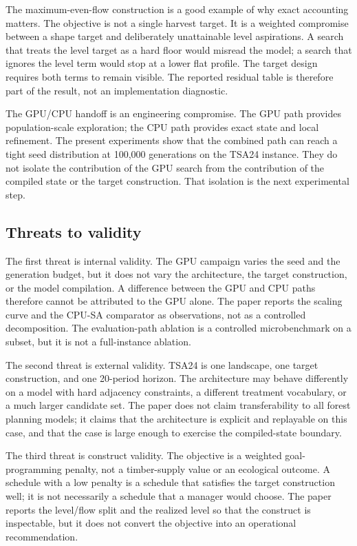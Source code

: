 \documentclass[11pt]{article}
\begin{document}
The maximum-even-flow construction is a good example of why exact accounting
matters. The objective is not a single harvest target. It is a weighted
compromise between a shape target and deliberately unattainable level
aspirations. A search that treats the level target as a hard floor would
misread the model; a search that ignores the level term would stop at a lower
flat profile. The target design requires both terms to remain visible. The
reported residual table is therefore part of the result, not an implementation
diagnostic.

The GPU/CPU handoff is an engineering compromise. The GPU path provides
population-scale exploration; the CPU path provides exact state and local
refinement. The present experiments show that the combined path can reach a
tight seed distribution at 100,000 generations on the TSA24 instance. They do
not isolate the contribution of the GPU search from the contribution of the
compiled state or the target construction. That isolation is the next
experimental step.

\subsection{Threats to validity}

The first threat is internal validity. The GPU campaign varies the seed and the generation budget, but
it does not vary the architecture, the target construction, or the model compilation. A difference
between the GPU and CPU paths therefore cannot be attributed to the GPU alone. The paper reports the
scaling curve and the CPU-SA comparator as observations, not as a controlled decomposition. The
evaluation-path ablation is a controlled microbenchmark on a subset, but it is not a full-instance
ablation.

The second threat is external validity. TSA24 is one landscape, one target construction, and one
20-period horizon. The architecture may behave differently on a model with hard adjacency constraints,
a different treatment vocabulary, or a much larger candidate set. The paper does not claim
transferability to all forest planning models; it claims that the architecture is explicit and
replayable on this case, and that the case is large enough to exercise the compiled-state boundary.

The third threat is construct validity. The objective is a weighted goal-programming penalty, not a
timber-supply value or an ecological outcome. A schedule with a low penalty is a schedule that
satisfies the target construction well; it is not necessarily a schedule that a manager would choose.
The paper reports the level/flow split and the realized level so that the construct is inspectable, but
it does not convert the objective into an operational recommendation.
\end{document}
